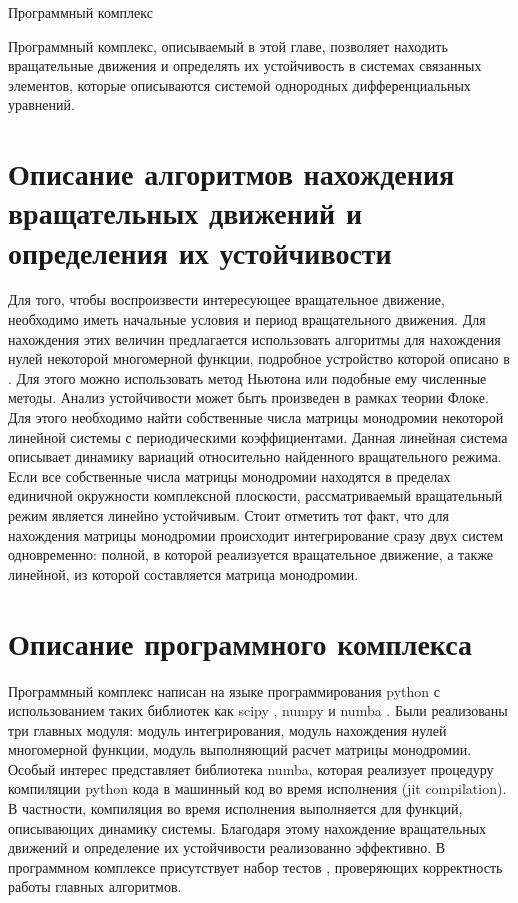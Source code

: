 \begin{chapter}{Программный комплекс}

	Программный комплекс, описываемый в этой главе, позволяет находить вращательные движения и
	определять их устойчивость в системах связанных элементов, которые описываются системой однородных
	дифференциальных уравнений.

\section{Описание алгоритмов нахождения вращательных движений и определения их устойчивости}
	Для того, чтобы воспроизвести интересующее вращательное движение, необходимо иметь
	начальные условия и период вращательного движения. Для нахождения этих величин предлагается использовать
	алгоритмы для нахождения нулей некоторой многомерной функции, подробное устройство которой описано в \cite{Khorkin}.
	Для этого можно использовать метод Ньютона или подобные ему численные методы.
	Анализ устойчивости может быть произведен в рамках теории Флоке. Для этого необходимо найти
	собственные числа матрицы монодромии некоторой линейной системы с периодическими коэффициентами.
	Данная линейная система описывает динамику вариаций относительно найденного вращательного режима. Если все собственные числа матрицы монодромии находятся в пределах
	единичной окружности комплексной плоскости, рассматриваемый вращательный режим является линейно устойчивым.
	Стоит отметить тот факт, что для нахождения матрицы монодромии происходит интегрирование сразу двух систем одновременно:
	полной, в которой реализуется вращательное движение, а также линейной, из которой составляется матрица монодромии.  
\section{Описание программного комплекса}
Программный комплекс написан на языке программирования python с использованием таких
библиотек как scipy \cite{scipy}, numpy \cite{numpy} и numba \cite{numba}.
Были реализованы три главных модуля: модуль интегрирования, модуль нахождения нулей многомерной функции, модуль выполняющий расчет
матрицы монодромии.
Особый интерес представляет библиотека numba, которая реализует процедуру 
компиляции python кода в машинный код во время исполнения (jit compilation).
В частности, компиляция во время исполнения выполняется для функций, описывающих динамику системы.
Благодаря этому нахождение вращательных движений и определение их устойчивости реализованно эффективно.
В программном комплексе присутствует набор тестов \cite{testing}, проверяющих корректность работы главных алгоритмов.


\end{chapter}
